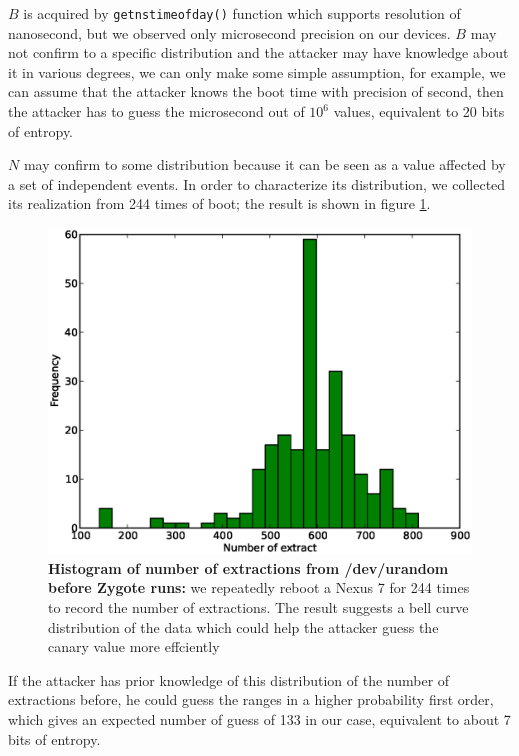 $B$ is acquired by \verb|getnstimeofday()| function which supports resolution of nanosecond, but we observed only microsecond precision on our devices.
$B$ may not confirm to a specific distribution and the attacker may have knowledge about it in various degrees, we can only make some simple assumption, for example, we can assume that the attacker knows the boot time with precision of second, then the attacker has to guess the microsecond out of $10^6$ values, equivalent to 20 bits of entropy.

$N$ may confirm to some distribution because it can be seen as a value affected by a set of independent events. In order to characterize its distribution, we collected its realization from 244 times of boot; the result is shown in figure \ref{fighist}.

\begin{figure}[t]
\begin{center}
\includegraphics[scale=0.4]{hist.eps}
\end{center}
\caption{{\bf Histogram of number of extractions from /dev/urandom before Zygote runs:} we repeatedly reboot a Nexus 7 for 244 times to record the number of extractions. The result suggests a bell curve distribution of the data which could help the attacker guess the canary value more effciently }
\label{fighist}
\end{figure}

If the attacker has prior knowledge of this distribution of the number of extractions before, he could guess the ranges in a higher probability first order, which gives an expected number of guess of 133 in our case, equivalent to about 7 bits of entropy.

